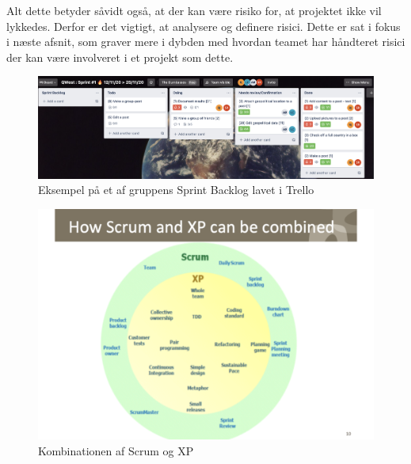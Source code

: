 Alt dette betyder såvidt også, at der kan være risiko for, at projektet ikke vil lykkedes. Derfor er det vigtigt, at analysere og definere risici. Dette er sat i fokus i næste afsnit, som graver mere i dybden med hvordan teamet har håndteret risici der kan være involveret i et projekt som dette.

\begin{figure}
    \includegraphics[width=\linewidth]{figures/SprintBacklog.png}
    \caption{Eksempel på et af gruppens Sprint Backlog lavet i Trello}
    \label{fig:Sprint}
\end{figure}


\begin{figure}
    \includegraphics[width=\linewidth]{figures/XP&Scrum.png}
    \caption{Kombinationen af Scrum og XP}
    \label{fig:Kombi}
\end{figure}

